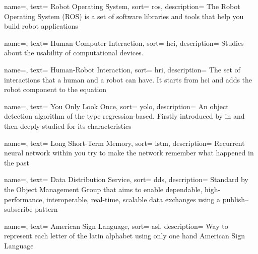 {
  name=,
  text= Robot Operating System,
  sort= ros,
  description= {The Robot Operating System (ROS) is a set of software libraries and tools that help you build robot applications~\cite{site:ros}}
}

{
  name=,
  text= Human-Computer Interaction,
  sort= hci,
  description= {Studies about the usability of computational devices.}
}

{
  name=,
  text= Human-Robot Interaction,
  sort= hri,
  description= {The set of interactions that a human and a robot can have. It starts from \gls{hci} and adds the robot component to the equation}
}

{
  name=,
  text= You Only Look Once,
  sort= yolo,
  description= {An object detection algorithm of the type regression-based. Firstly introduced by \citeauthor{article:yolov1}\cite{article:yolov1} in \citeyear{article:yolov1} and then deeply studied for its characteristics}
}

{
  name=,
  text= Long Short-Term Memory,
  sort= lstm,
  description= {Recurrent neural network within you try to make the network remember what happened in the past}
}

{
  name=,
  text= Data Distribution Service,
  sort= dds,
  description= {Standard by the Object Management Group that aims to enable dependable, high-performance, interoperable, real-time, scalable data exchanges using a publish–subscribe pattern}
}

{
  name=,
  text= American Sign Language,
  sort= asl,
  description= {Way to represent each letter of the latin alphabet using only one hand}
}
 {American Sign Language}

